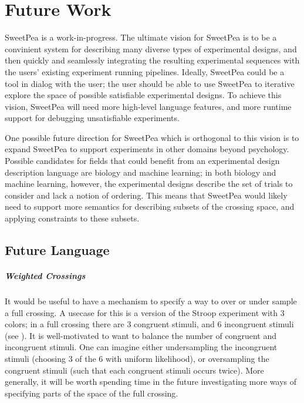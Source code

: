 \chapter{Future Work}

SweetPea is a work-in-progress. The ultimate vision for SweetPea is to be a convinient system for describing many diverse types of experimental designs, and then quickly and seamlessly integrating the resulting experimental sequences with the users' existing experiment running pipelines. Ideally, SweetPea could be a tool in dialog with the user; the user should be able to use SweetPea to iterative explore the space of possible satisfiable experimental designs. To achieve this vision, SweetPea will need more high-level language features, and more runtime support for debugging unsatisfiable experiments.

One possible future direction for SweetPea which is orthogonal to this vision is to expand SweetPea to support experiments in other domains beyond psychology. Possible candidates for fields that could benefit from an experimental design description language are biology and machine learning; in both biology and machine learning, however, the experimental designs describe the set of trials to consider and lack a notion of ordering. This means that SweetPea would likely need to support more semantics for describing subsets of the crossing space, and applying constraints to these subsets.

\section{Future Language}


\paragraph*{Weighted Crossings}
It would be useful to have a mechanism to specify a way to over or under sample a full crossing. A usecase for this is a version of the Stroop experiment with 3 colors; in a full crossing there are 3 congruent stimuli, and 6 incongruent stimuli (see ). It is well-motivated to want to balance the number of congruent and incongruent stimuli. One can imagine either undersampling the incongruent stimuli (choosing 3 of the 6 with uniform likelihood), or oversampling the congruent stimuli (such that each congruent stimuli occurs twice). More generally, it will be worth spending time in the future investigating more ways of specifying parts of the space of the full crossing.

